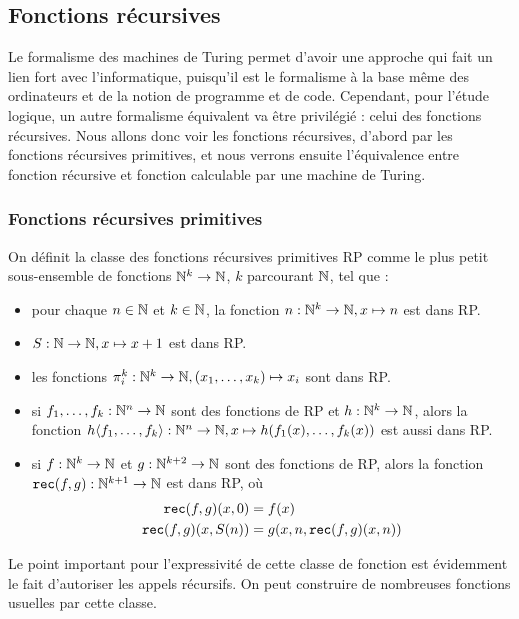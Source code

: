 \subsection{Fonctions récursives}

Le formalisme des machines de Turing permet d'avoir une approche qui fait un lien fort avec l'informatique, puisqu'il est le formalisme à la base même des ordinateurs et de la notion de programme et de code. Cependant, pour l'étude logique, un autre formalisme équivalent va être privilégié : celui des fonctions récursives. Nous allons donc voir les fonctions récursives, d'abord par les fonctions récursives primitives, et nous verrons ensuite l'équivalence entre fonction récursive et fonction calculable par une machine de Turing.

\subsubsection{Fonctions récursives primitives}

\begin{defi}[Classe RP]
On définit la classe des fonctions récursives primitives RP comme le plus petit sous-ensemble de fonctions $\mathbb{N}^k\to\mathbb{N}$, $k$ parcourant $\mathbb{N}$, tel que :
\begin{itemize}[label=$\bullet$]
    \item pour chaque $n\in\mathbb{N}$ et $k\in\mathbb{N}$, la fonction $n : \mathbb{N}^k\to\mathbb{N}, x \mapsto n$ est dans RP.
    \item $S : \mathbb{N} \to \mathbb{N}, x \mapsto x+1$ est dans RP.
    \item les fonctions $\pi_i^k : \mathbb{N}^k\to\mathbb{N}, (x_1,\ldots,x_k)\mapsto x_i$ sont dans RP.
    \item si $f_1,\ldots,f_k : \mathbb{N}^n \to \mathbb{N}$ sont des fonctions de RP et $h : \mathbb{N}^k\to\mathbb{N}$, alors la fonction $h\langle f_1,\ldots,f_k\rangle : \mathbb{N}^n \to\mathbb{N}, x \mapsto h(f_1(x),\ldots,f_k(x))$ est aussi dans RP.
    \item si $f : \mathbb{N}^k\to\mathbb{N}$ et $g : \mathbb{N}^{k+2}\to\mathbb{N}$ sont des fonctions de RP, alors la fonction $\texttt{rec}(f,g) : \mathbb{N}^{k+1} \to\mathbb{N}$ est dans RP, où \begin{align*}
        \texttt{rec}(f,g)(x,0) &= f(x)\\
        \texttt{rec}(f,g)(x,S(n)) &= g(x,n,\texttt{rec}(f,g)(x,n))
    \end{align*}
\end{itemize}
\end{defi}

Le point important pour l'expressivité de cette classe de fonction est évidemment le fait d'autoriser les appels récursifs. On peut construire de nombreuses fonctions usuelles par cette classe.


